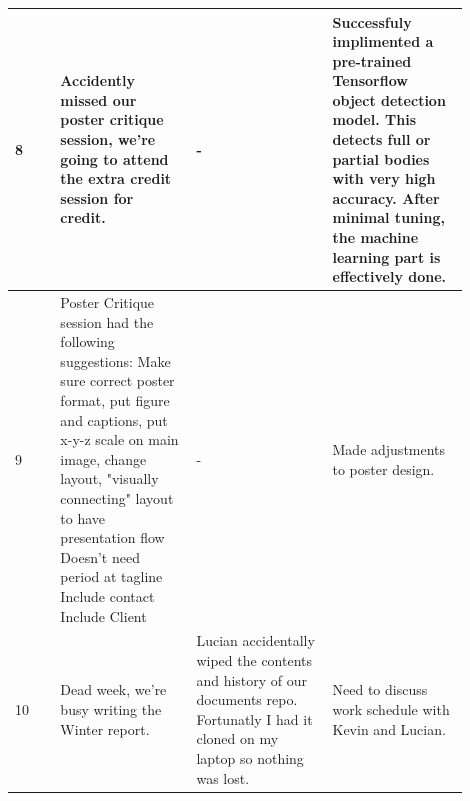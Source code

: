 \documentclass[onecolumn, draftclsnofoot,10pt, compsoc]{IEEEtran}
\begin{document}
\begin{singlespace}
\begin{longtable}{|l|p{0.3\linewidth}|p{0.3\linewidth}|p{0.3\linewidth}|}
		8	&
			Accidently missed our poster critique session, we're going to attend the extra credit session for credit.
			&
			-
			&
			Successfuly implimented a pre-trained Tensorflow object detection model.
			This detects full or partial bodies with very high accuracy.
			After minimal tuning, the machine learning part is effectively done.
			\\\hline

		9	&
			Poster Critique session had the following suggestions: Make sure correct poster format, put figure and captions, put x-y-z scale on main image, change layout, "visually connecting" layout to have presentation flow
			Doesn’t need period at tagline
			Include contact
			Include Client
			&
			-
			&
			Made adjustments to poster design.
			\\\hline

		10	&
			Dead week, we're busy writing the Winter report.
			&
			Lucian accidentally wiped the contents and history of our documents repo.
			Fortunatly I had it cloned on my laptop so nothing was lost.
			&
			Need to discuss work schedule with Kevin and Lucian.
			\\\hline
		\end{longtable}


\end{singlespace}
\end{document}

